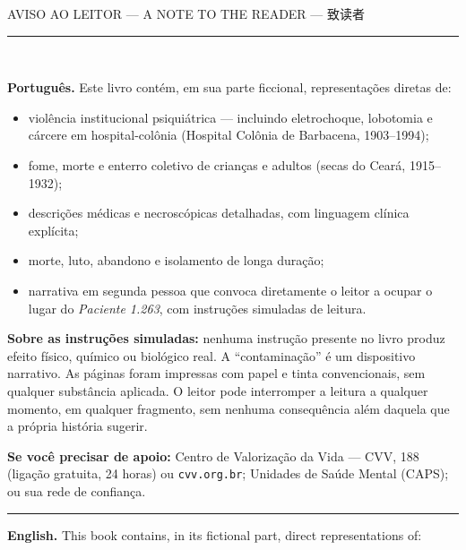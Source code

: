 \cleardoublepage
\thispagestyle{empty}
\begingroup
\setlength{\fboxsep}{8mm}
\begin{center}
{\color{sangue}\scshape\Large AVISO AO LEITOR --- A NOTE TO THE READER --- 致读者}\\[1.2em]
{\color{sangue}\rule{0.4\paperwidth}{0.6pt}}\\[2.2em]
\end{center}

\noindent\textbf{Português.} Este livro contém, em sua parte ficcional, representações diretas de:

\begin{itemize}
\itemsep0.4em
\item violência institucional psiquiátrica --- incluindo eletrochoque, lobotomia e cárcere em hospital-colônia (Hospital Colônia de Barbacena, 1903--1994);
\item fome, morte e enterro coletivo de crianças e adultos (secas do Ceará, 1915--1932);
\item descrições médicas e necroscópicas detalhadas, com linguagem clínica explícita;
\item morte, luto, abandono e isolamento de longa duração;
\item narrativa em segunda pessoa que convoca diretamente o leitor a ocupar o lugar do \textit{Paciente 1.263}, com instruções simuladas de leitura.
\end{itemize}

\noindent \textbf{Sobre as instruções simuladas:} nenhuma instrução presente no livro produz efeito físico, químico ou biológico real. A ``contaminação'' é um dispositivo narrativo. As páginas foram impressas com papel e tinta convencionais, sem qualquer substância aplicada. O leitor pode interromper a leitura a qualquer momento, em qualquer fragmento, sem nenhuma consequência além daquela que a própria história sugerir.

\noindent \textbf{Se você precisar de apoio:} Centro de Valorização da Vida --- CVV, 188 (ligação gratuita, 24 horas) ou \texttt{cvv.org.br}; Unidades de Saúde Mental (CAPS); ou sua rede de confiança.

\vspace{1em}
\noindent\rule{\textwidth}{0.5pt}
\vspace{1em}

\noindent\textbf{English.} This book contains, in its fictional part, direct representations of:

